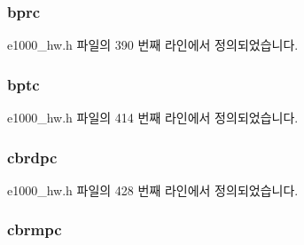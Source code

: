 \subsubsection[{\texorpdfstring{bprc}{bprc}}]{ bprc}\hypertarget{structe1000__hw__stats_a06189842766bef9de920946e3ced6cf5}{}\label{structe1000__hw__stats_a06189842766bef9de920946e3ced6cf5}


e1000\+\_\+hw.\+h 파일의 390 번째 라인에서 정의되었습니다.

\subsubsection[{\texorpdfstring{bptc}{bptc}}]{ bptc}\hypertarget{structe1000__hw__stats_ad7c54ab2ca4cb53041e3545d93431ada}{}\label{structe1000__hw__stats_ad7c54ab2ca4cb53041e3545d93431ada}


e1000\+\_\+hw.\+h 파일의 414 번째 라인에서 정의되었습니다.

\subsubsection[{\texorpdfstring{cbrdpc}{cbrdpc}}]{ cbrdpc}\hypertarget{structe1000__hw__stats_a698611e7d2bb2a6064b350a56c271c01}{}\label{structe1000__hw__stats_a698611e7d2bb2a6064b350a56c271c01}


e1000\+\_\+hw.\+h 파일의 428 번째 라인에서 정의되었습니다.

\subsubsection[{\texorpdfstring{cbrmpc}{cbrmpc}}]{ cbrmpc}\hypertarget{structe1000__hw__stats_a5030cd36c1d8de6448438dc132813eae}{}\label{structe1000__hw__stats_a5030cd36c1d8de6448438dc132813eae}


